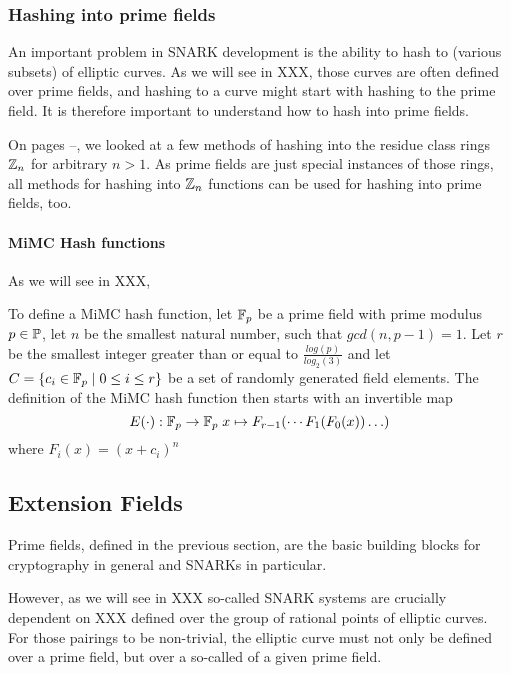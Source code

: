 \subsubsection{Hashing into prime fields}\label{hashing-prime-fields}
An important problem in SNARK development is the ability to hash to (various subsets) of elliptic curves. As we will see in XXX, those curves are often defined over prime fields, and hashing to a curve might start with hashing to the prime field. It is therefore important to understand how to hash into prime fields.

On pages \pageref{hashing-start}--\pageref{hashing-end}, we looked at a few methods of hashing into the residue class rings $\mathbb{Z}_n$ for arbitrary $n>1$. As prime fields are just special instances of those rings, all methods for hashing into $\mathbb{Z}_n$ functions can be used for hashing into prime fields, too.
\paragraph{MiMC Hash functions} As we will see in XXX, 

To define a MiMC hash function, let $\mathbb{F}_p$ be a prime field with prime modulus $p\in\mathbb{P}$, let $n$ be the smallest natural number, such that  $gcd(n, p-1) = 1$. Let $r$ be the smallest integer greater than or equal to $\frac{log(p)}{log_2(3)}$ and let $C=\{c_i\in \mathbb{F}_p \;|\; 0\leq i \leq r\}$ be a set of randomly generated field elements. The definition of the MiMC hash function then starts with an invertible map
\begin{equation}
E(\cdot) : \mathbb{F}_p \to \mathbb{F}_p\; x \mapsto F_{r-1}(\cdots F_1(F_0(x))\ldots)
\end{equation}
where $F_i(x)= (x+c_i)^n$


\subsection{Extension Fields}\label{field-extension}
Prime fields, defined in the previous section, are the basic building blocks for cryptography in general and SNARKs in particular.

However, as we will see in XXX so-called  SNARK systems are crucially dependent on  XXX defined over the group of rational points of elliptic curves. For those pairings to be non-trivial, the elliptic curve must not only be defined over a prime field, but over a so-called  of a given prime field.

